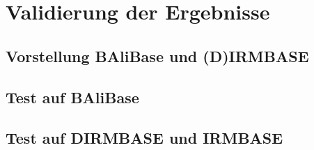 \chapter{Validierung der Ergebnisse}
\label{ch:Validierung}

\section{Vorstellung BAliBase und (D)IRMBASE}

\section{Test auf BAliBase}

\section{Test auf DIRMBASE und IRMBASE}